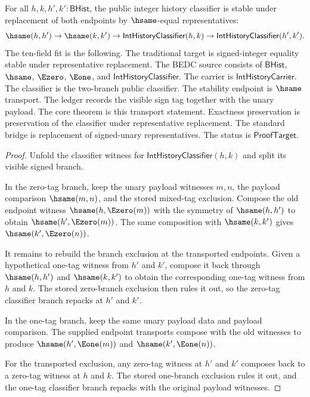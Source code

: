 \begin{theorem}
\label{thm:int-history-classifier-hsame-transport}
For all $h,k,h',k':\mathsf{BHist}$, the public integer history classifier is
stable under replacement of both endpoints by $\hsame$-equal representatives:
$$
\hsame(h,h')\to
\hsame(k,k')\to
\mathsf{IntHistoryClassifier}(h,k)\to
\mathsf{IntHistoryClassifier}(h',k').
$$
The ten-field fit is the following. The traditional target is signed-integer
equality stable under representative replacement. The BEDC source consists of
$\mathsf{BHist}$, $\hsame$, $\Ezero$, $\Eone$, and
$\mathsf{IntHistoryClassifier}$. The carrier is
$\mathsf{IntHistoryCarrier}$. The classifier is the two-branch public
classifier. The stability endpoint is $\hsame$ transport. The ledger records
the visible sign tag together with the unary payload. The core theorem is this
transport statement. Exactness preservation is preservation of the classifier
under representative replacement. The standard bridge is replacement of
signed-unary representatives. The status is $\mathsf{ProofTarget}$.
\end{theorem}
\begin{proof}
Unfold the classifier witness for $\mathsf{IntHistoryClassifier}(h,k)$ and
split its visible signed branch.

In the zero-tag branch, keep the unary payload witnesses $m,n$, the payload
comparison $\hsame(m,n)$, and the stored mixed-tag exclusion. Compose the old
endpoint witness $\hsame(h,\Ezero(m))$ with the symmetry of $\hsame(h,h')$ to
obtain $\hsame(h',\Ezero(m))$. The same composition with $\hsame(k,k')$ gives
$\hsame(k',\Ezero(n))$.

It remains to rebuild the branch exclusion at the transported endpoints. Given
a hypothetical one-tag witness from $h'$ and $k'$, compose it back through
$\hsame(h,h')$ and $\hsame(k,k')$ to obtain the corresponding one-tag witness
from $h$ and $k$. The stored zero-branch exclusion then rules it out, so the
zero-tag classifier branch repacks at $h'$ and $k'$.

In the one-tag branch, keep the same unary payload data and payload
comparison. The supplied endpoint transports compose with the old witnesses to
produce $\hsame(h',\Eone(m))$ and $\hsame(k',\Eone(n))$.

For the transported exclusion, any zero-tag witness at $h'$ and $k'$ composes
back to a zero-tag witness at $h$ and $k$. The stored one-branch exclusion
rules it out, and the one-tag classifier branch repacks with the original
payload witnesses.
\end{proof}
